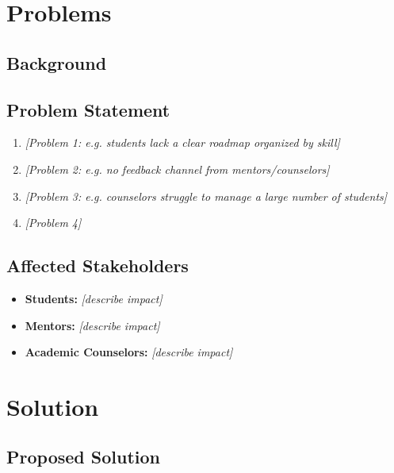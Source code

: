 \documentclass[12pt,a4paper]{report}
\begin{document}
\chapter{Problems}

\section{Background}

\section{Problem Statement}
\begin{enumerate}[leftmargin=1.2cm]
    \item \textit{[Problem 1: e.g. students lack a clear roadmap organized by skill]}
    \item \textit{[Problem 2: e.g. no feedback channel from mentors/counselors]}
    \item \textit{[Problem 3: e.g. counselors struggle to manage a large number of students]}
    \item \textit{[Problem 4]}
\end{enumerate}

\section{Affected Stakeholders}
\begin{itemize}[leftmargin=1.2cm]
    \item \textbf{Students:} \textit{[describe impact]}
    \item \textbf{Mentors:} \textit{[describe impact]}
    \item \textbf{Academic Counselors:} \textit{[describe impact]}
\end{itemize}

\chapter{Solution}

\section{Proposed Solution}
\end{document}

